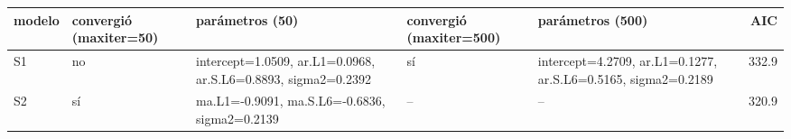 \begin{tabular}{lllllr}
\toprule
modelo & convergió (maxiter=50) & parámetros (50) & convergió (maxiter=500) & parámetros (500) & AIC \\
\midrule
S1 & no & intercept=1.0509, ar.L1=0.0968, ar.S.L6=0.8893, sigma2=0.2392 & sí & intercept=4.2709, ar.L1=0.1277, ar.S.L6=0.5165, sigma2=0.2189 & 332.9 \\
S2 & sí & ma.L1=-0.9091, ma.S.L6=-0.6836, sigma2=0.2139 & -- & -- & 320.9 \\
\bottomrule
\end{tabular}
